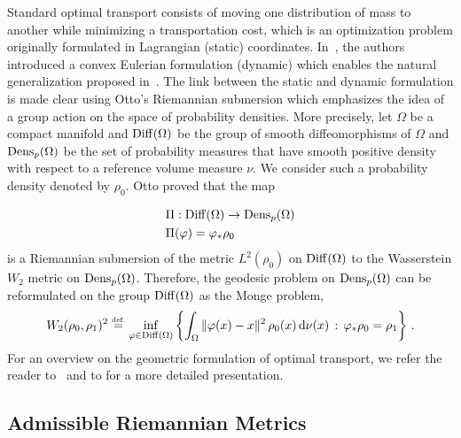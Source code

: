
Standard optimal transport consists of moving one distribution of mass to another while minimizing a transportation cost, which is an optimization problem originally formulated in Lagrangian (static) coordinates. In~\cite{benamou2000computational}, the authors introduced a convex Eulerian formulation (dynamic) which enables the natural generalization proposed in~\cite{ChizatOTFR2015,new2015kondratyev}. The link between the static and dynamic formulation is made clear using Otto's Riemannian submersion \cite{OttoPorousMedium} which emphasizes the idea of a group action on the space of probability densities.
More precisely, let $\Omega$ be a compact manifold and $\operatorname{Diff}(\Omega)$ be the group of smooth diffeomorphisms of $\Omega$ and $\operatorname{Dens}_p(\Omega)$ be the set of probability measures that have smooth positive density with respect to a reference volume measure $\nu$. We consider such a probability density denoted by $\rho_0$. Otto proved that the map 

\begin{align*}& \Pi: \operatorname{Diff}(\Omega) \to \operatorname{Dens}_p(\Omega) \\
&\Pi(\varphi) = \varphi_* \rho_0
\end{align*} 
is a Riemannian submersion of the metric $L^2(\rho_0)$ on  $ \operatorname{Diff}(\Omega)$ to the Wasserstein $W_2$ metric on $\operatorname{Dens}_p(\Omega)$. Therefore, the geodesic problem on $\operatorname{Dens}_p(\Omega)$ can be reformulated on the group $\operatorname{Diff}(\Omega)$ as the Monge problem,
\begin{equation}
W_2(\rho_0, \rho_1)^2 \stackrel{\mbox{\upshape\tiny def.}}{=} \inf_{\varphi \in \operatorname{Diff}(\Omega)} \left\{ \int_\Omega \| \varphi(x) - x\|^2  \, \rho_0(x) \, \mathrm{d} \nu(x) \, : \, \varphi_*\rho_0 = \rho_1 \right\}\,.
\end{equation}
For an overview on the geometric formulation of optimal transport, we refer the reader to~\cite{khesin2008geometry} and to \cite{DelanoeGeometryOT} for a more detailed presentation.

\subsection{Admissible Riemannian Metrics}\label{sec:AdmissibleMetrics}


